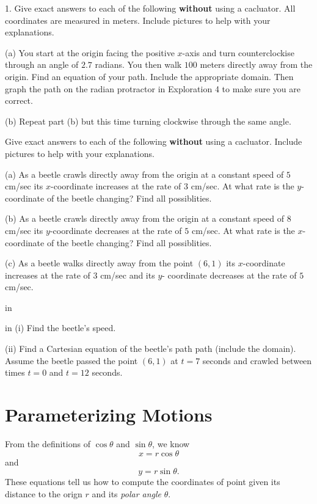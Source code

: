 \documentclass{ximera}
\newcommand{\pskip}{\vskip 0.1 in}
\begin{document}
\begin{question}  \label{Qsdg53:Cosine}
1. Give exact answers to each of the following {\bf without} using a cacluator. All coordinates are measured in meters. Include pictures to help with your explanations.

(a) You start at the origin facing the positive $x$-axis and turn counterclockise through an angle of $2.7$ radians. You then walk $100$ meters directly away from the origin. Find an equation of your path. Include the appropriate domain. Then graph the path on the radian protractor in Exploration 4 to make sure you are correct.

(b) Repeat part (b) but this time turning clockwise through the same angle. 


\end{question}



\begin{question} \label{Qet433:Cosine}
Give exact answers to each of the following {\bf without} using a cacluator. Include pictures to help with your explanations.

(a) As a beetle crawls directly away from the origin at a constant speed of $5$ cm/sec its $x$-coordinate increases at the rate of $3$ cm/sec. At what rate is the $y$-coordinate of the beetle changing? Find all possiblities. 

(b) As a beetle crawls directly away from the origin at a constant speed of $8$ cm/sec its $y$-coordinate decreases at the rate of $5$ cm/sec. At what rate is the $x$-coordinate of the beetle changing? Find all possiblities. 

(c) As a beetle walks directly away from the point $(6,1)$ its $x$-coordinate increases at the rate of $3$ cm/sec and its $y$-
coordinate decreases at the rate of $5$ cm/sec. 

\pskip

 in (i) Find the beetle's speed. 

(ii) Find a Cartesian equation of the beetle's path path (include the domain). Assume the beetle passed the point $(6,1)$ at $t=7$ seconds and crawled between times $t=0$ and $t=12$ seconds. 


\end{question}




\section{Parameterizing Motions}
From the definitions of $\cos\theta$ and $\sin \theta$, we know
\[
    x = r \cos \theta 
\]
and
\[
      y=r\sin \theta .
\]
These equations tell us how to compute the coordinates of point given its distance to the orign $r$ and its \emph{polar angle} $\theta$.
\end{document}
